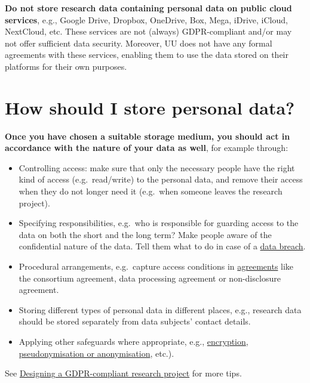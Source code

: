 \documentclass[
]{book}
\providecommand{\tightlist}{%
  \setlength{\itemsep}{0pt}\setlength{\parskip}{0pt}}
\begin{document}
\textbf{Do not store research data containing personal data on public cloud services},
e.g., Google Drive, Dropbox, OneDrive, Box, Mega, iDrive, iCloud, NextCloud, etc.
These services are not (always) GDPR-compliant and/or may not offer sufficient
data security. Moreover, UU does not have any formal agreements with these
services, enabling them to use the data stored on their platforms for their own
purposes.

\hypertarget{data-storage-how}{%
\section{How should I store personal data?}\label{data-storage-how}}

\textbf{Once you have chosen a suitable storage medium, you should act in accordance
with the nature of your data as well}, for example through:

\begin{itemize}
\tightlist
\item
  Controlling access: make sure that only the necessary people have the right
  kind of access (e.g.~read/write) to the personal data, and remove their access
  when they do not longer need it (e.g.~when someone leaves the research project).\\
\item
  Specifying responsibilities, e.g.~who is responsible for guarding access to the
  data on both the short and the long term? Make people aware of the confidential
  nature of the data. Tell them what to do in case of a
  \href{https://intranet.uu.nl/en/knowledgebase/what-is-a-personal-data-breach}{data breach}.
\item
  Procedural arrangements, e.g.~capture access conditions in
  \protect\hyperlink{agreements}{agreements} like the consortium agreement, data processing
  agreement or non-disclosure agreement.
\item
  Storing different types of personal data in different places, e.g., research
  data should be stored separately from data subjects' contact details.
\item
  Applying other safeguards where appropriate, e.g., \protect\hyperlink{encryption}{encryption},
  \protect\hyperlink{pseudonymisation-anonymisation}{pseudonymisation or anonymisation}, etc.).
\end{itemize}

See \protect\hyperlink{privacy-by-design}{Designing a GDPR-compliant research project} for more tips.
\end{document}
